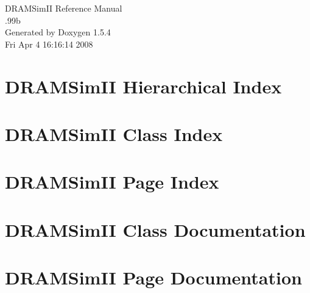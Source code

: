 \documentclass[a4paper]{book}
\begin{document}
\begin{titlepage}
\vspace*{7cm}
\begin{center}
{\Large DRAMSimII Reference Manual\\[1ex]\large .99b }\\
\vspace*{1cm}
{\large Generated by Doxygen 1.5.4}\\
\vspace*{0.5cm}
{\small Fri Apr 4 16:16:14 2008}\\
\end{center}
\end{titlepage}
\clearemptydoublepage
{}
\tableofcontents
\clearemptydoublepage
{}
\chapter{DRAMSimII Hierarchical Index}

\chapter{DRAMSimII Class Index}

\chapter{DRAMSimII Page Index}

\chapter{DRAMSimII Class Documentation}




\chapter{DRAMSimII Page Documentation}

\printindex
\end{document}

